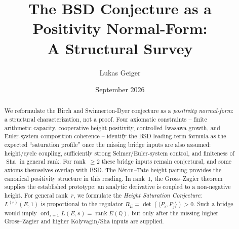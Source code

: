 \documentclass[aps,prd,twocolumn,superscriptaddress,nofootinbib,floatfix]{revtex4-2}
\theoremstyle{definition}
\theoremstyle{remark}
\DeclareMathOperator{\ord}{ord}
\DeclareMathOperator{\rank}{rank}
\DeclareMathOperator{\Sha}{Sha}
\begin{document}

\title{\texorpdfstring{The BSD Conjecture as a Positivity Normal-Form:\\A Structural Survey}{The BSD Conjecture as a Positivity Normal-Form: A Structural Survey}}

\author{Lukas Geiger}

\date{September 2026}

\begin{abstract}
We reformulate the Birch and Swinnerton-Dyer conjecture as a \textit{positivity normal-form}: a structural characterization, not a proof. Four axiomatic constraints -- finite arithmetic capacity, cooperative height positivity, controlled Iwasawa growth, and Euler-system composition coherence -- identify the BSD leading-term formula as the expected ``saturation profile'' once the missing bridge inputs are also assumed: height/cycle coupling, sufficiently strong Selmer/Euler-system control, and finiteness of $\Sha$ in general rank. For rank~$\geq 2$ these bridge inputs remain conjectural, and some axioms themselves overlap with BSD. The Néron--Tate height pairing provides the canonical positivity structure in this reading. In rank~1, the Gross--Zagier theorem supplies the established prototype: an analytic derivative is coupled to a non-negative height. For general rank~$r$, we formulate the \textit{Height Saturation Conjecture}: $L^{(r)}(E,1)$ is proportional to the regulator $R_E = \det(\langle P_i, P_j \rangle) > 0$. Such a bridge would imply $\ord_{s=1} L(E,s) = \rank E(\mathbb{Q})$, but only after the missing higher Gross--Zagier and higher Kolyvagin/Sha inputs are supplied.
\end{abstract}


\maketitle
\onecolumngrid
\clearpage
\begingroup
\footnotesize
\linespread{0.92}\selectfont
\setlength{\parskip}{0pt}
\tableofcontents
\endgroup
\clearpage
\twocolumngrid
\end{document}
